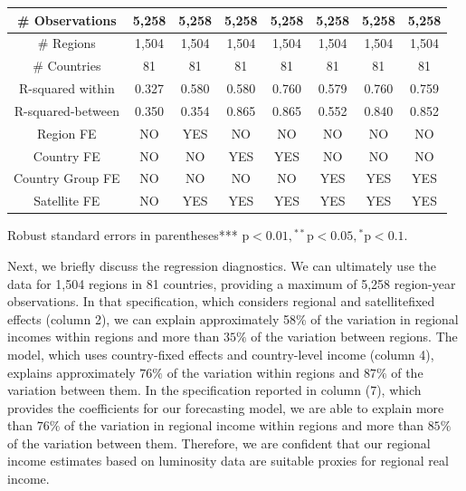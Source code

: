 \documentclass[10pt]{article}
\begin{document}
\begin{center}
\begin{tabular}{|c|c|c|c|c|c|c|c|}
\hline
\# Observations & 5,258 & 5,258 & 5,258 & 5,258 & 5,258 & 5,258 & 5,258 \\
\hline
\# Regions & 1,504 & 1,504 & 1,504 & 1,504 & 1,504 & 1,504 & 1,504 \\
\hline
\# Countries & 81 & 81 & 81 & 81 & 81 & 81 & 81 \\
\hline
R-squared within & 0.327 & 0.580 & 0.580 & 0.760 & 0.579 & 0.760 & 0.759 \\
\hline
R-squared-between & 0.350 & 0.354 & 0.865 & 0.865 & 0.552 & 0.840 & 0.852 \\
\hline
Region FE & NO & YES & NO & NO & NO & NO & NO \\
\hline
Country FE & NO & $\mathrm{NO}$ & YES & YES & NO & $\mathrm{NO}$ & NO \\
\hline
Country Group FE & NO & NO & NO & NO & YES & YES & YES \\
\hline
Satellite FE & $\mathrm{NO}$ & YES & YES & YES & YES & YES & YES \\
\hline
\end{tabular}
\end{center}

Robust standard errors in parentheses*** $\mathrm{p}<0.01,{ }^{* *} \mathrm{p}<0.05,{ }^{*} \mathrm{p}<0.1$.

Next, we briefly discuss the regression diagnostics. We can ultimately use the data for 1,504 regions in 81 countries, providing a maximum of 5,258 region-year observations. In that specification, which considers regional and satellitefixed effects (column 2), we can explain approximately 58\% of the variation in regional incomes within regions and more than $35 \%$ of the variation between regions. The model, which uses country-fixed effects and country-level income (column 4), explains approximately $76 \%$ of the variation within regions and $87 \%$ of the variation between them. In the specification reported in column (7), which provides the coefficients for our forecasting model, we are able to explain more than $76 \%$ of the variation in regional income within regions and more than $85 \%$ of the variation between them. Therefore, we are confident that our regional income estimates based on luminosity data are suitable proxies for regional real income.
\end{document}
